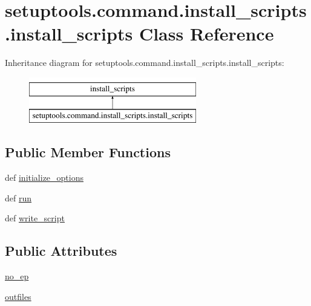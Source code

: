 \hypertarget{classsetuptools_1_1command_1_1install__scripts_1_1install__scripts}{}\section{setuptools.\+command.\+install\+\_\+scripts.\+install\+\_\+scripts Class Reference}
\label{classsetuptools_1_1command_1_1install__scripts_1_1install__scripts}
Inheritance diagram for setuptools.\+command.\+install\+\_\+scripts.\+install\+\_\+scripts\+:\begin{figure}[H]
\begin{center}
\leavevmode
\includegraphics[height=2.000000cm]{classsetuptools_1_1command_1_1install__scripts_1_1install__scripts}
\end{center}
\end{figure}
\subsection*{Public Member Functions}
\begin{DoxyCompactItemize}
\item 
def \hyperlink{classsetuptools_1_1command_1_1install__scripts_1_1install__scripts_a8284d04353b2b79b48b4d64fceb4165a}{initialize\+\_\+options}
\item 
def \hyperlink{classsetuptools_1_1command_1_1install__scripts_1_1install__scripts_a90d557c43832dbf29d0d6435805da94b}{run}
\item 
def \hyperlink{classsetuptools_1_1command_1_1install__scripts_1_1install__scripts_a89f68e2d891681ca93338b314cc88c1b}{write\+\_\+script}
\end{DoxyCompactItemize}
\subsection*{Public Attributes}
\begin{DoxyCompactItemize}
\item 
\hyperlink{classsetuptools_1_1command_1_1install__scripts_1_1install__scripts_ab3f8cf531a8e925503b2b9d598c48744}{no\+\_\+ep}
\item 
\hyperlink{classsetuptools_1_1command_1_1install__scripts_1_1install__scripts_a1405b8119b7dce643aeb6f477bd7947f}{outfiles}
\end{DoxyCompactItemize}



